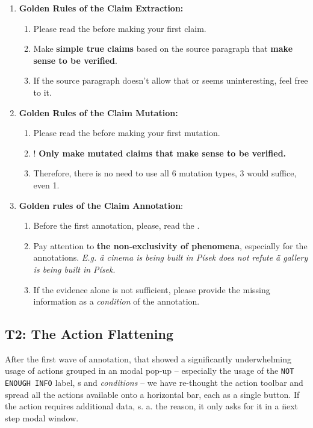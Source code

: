 \begin{enumerate}
        \item[\itembox{\tjednaa{}}] \textbf{Golden Rules of the Claim Extraction:} 
        \begin{enumerate}
            \item[\itembox{1.}] Please read the  before making your first claim.
            \item[\itembox{2.}] Make \textbf{simple true claims} based on the source paragraph that\textbf{ make sense to be verified}.
            \item[\itembox{3.}] If the source paragraph doesn't allow that or seems uninteresting, feel free to  it.
        \end{enumerate}
        \item[\itembox{\tjednab{}}] \textbf{Golden Rules of the  Claim Mutation:}
        \begin{enumerate}
            \item[\itembox{1.}] Please read the  before making your first mutation.
            \item[\itembox{2.}] {\techbf !} \textbf{Only make mutated claims that make sense to be verified.}
            \item[\itembox{3.}] Therefore, there is no need to use all 6 mutation types, 3 would suffice, even 1.
        \end{enumerate}
        \item[\itembox{\tdva{}}] \textbf{Golden rules of the Claim Annotation}: 
        \begin{enumerate}
            \item[\itembox{1.}]Before the first annotation, please, read the  .
            \item[\itembox{2.}]Pay attention to \textbf{the non-exclusivity of phenomena}, especially for the  annotations. \textit{E.g. \"{a cinema is being built in Písek} does not refute \"{a gallery is being built in Písek}}.
            \item[\itembox{3.}] If the evidence alone is not sufficient, please provide the missing information as a \textit{condition} of the annotation.
        \end{enumerate}
    \end{enumerate}
    
\subsection{T2: The Action Flattening}
\label{sec:flat}
After the first wave of annotation, that showed  a significantly underwhelming usage of \tdva{} actions grouped in an  modal pop-up -- especially the usage of the \texttt{NOT ENOUGH INFO} label, s and \textit{conditions} -- we have re-thought the action toolbar and spread all the actions available onto a horizontal bar, each as a single button. If the action requires additional data, s. a. the  reason, it only asks for it in a \"{next step} modal window.

